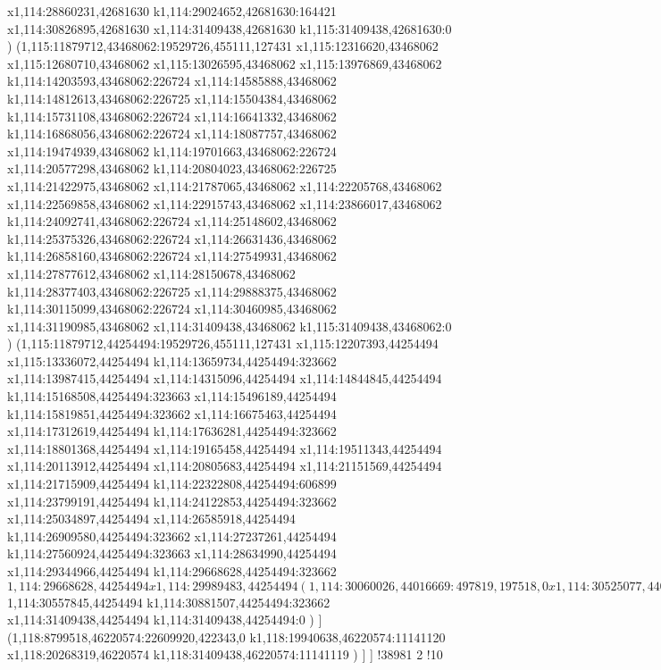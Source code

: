 {x1,114:28860231,42681630
k1,114:29024652,42681630:164421
x1,114:30826895,42681630
x1,114:31409438,42681630
k1,115:31409438,42681630:0
)
(1,115:11879712,43468062:19529726,455111,127431
x1,115:12316620,43468062
x1,115:12680710,43468062
x1,115:13026595,43468062
x1,115:13976869,43468062
k1,114:14203593,43468062:226724
x1,114:14585888,43468062
k1,114:14812613,43468062:226725
x1,114:15504384,43468062
k1,114:15731108,43468062:226724
x1,114:16641332,43468062
k1,114:16868056,43468062:226724
x1,114:18087757,43468062
x1,114:19474939,43468062
k1,114:19701663,43468062:226724
x1,114:20577298,43468062
k1,114:20804023,43468062:226725
x1,114:21422975,43468062
x1,114:21787065,43468062
x1,114:22205768,43468062
x1,114:22569858,43468062
x1,114:22915743,43468062
x1,114:23866017,43468062
k1,114:24092741,43468062:226724
x1,114:25148602,43468062
k1,114:25375326,43468062:226724
x1,114:26631436,43468062
k1,114:26858160,43468062:226724
x1,114:27549931,43468062
x1,114:27877612,43468062
x1,114:28150678,43468062
k1,114:28377403,43468062:226725
x1,114:29888375,43468062
k1,114:30115099,43468062:226724
x1,114:30460985,43468062
x1,114:31190985,43468062
x1,114:31409438,43468062
k1,115:31409438,43468062:0
)
(1,115:11879712,44254494:19529726,455111,127431
x1,115:12207393,44254494
x1,115:13336072,44254494
k1,114:13659734,44254494:323662
x1,114:13987415,44254494
x1,114:14315096,44254494
x1,114:14844845,44254494
k1,114:15168508,44254494:323663
x1,114:15496189,44254494
k1,114:15819851,44254494:323662
x1,114:16675463,44254494
x1,114:17312619,44254494
k1,114:17636281,44254494:323662
x1,114:18801368,44254494
x1,114:19165458,44254494
x1,114:19511343,44254494
x1,114:20113912,44254494
x1,114:20805683,44254494
x1,114:21151569,44254494
x1,114:21715909,44254494
k1,114:22322808,44254494:606899
x1,114:23799191,44254494
k1,114:24122853,44254494:323662
x1,114:25034897,44254494
x1,114:26585918,44254494
k1,114:26909580,44254494:323662
x1,114:27237261,44254494
k1,114:27560924,44254494:323663
x1,114:28634990,44254494
x1,114:29344966,44254494
k1,114:29668628,44254494:323662
$1,114:29668628,44254494
x1,114:29989483,44254494
(1,114:30060026,44016669:497819,197518,0
x1,114:30525077,44016669
)
$1,114:30557845,44254494
k1,114:30881507,44254494:323662
x1,114:31409438,44254494
k1,114:31409438,44254494:0
)
]
(1,118:8799518,46220574:22609920,422343,0
k1,118:19940638,46220574:11141120
x1,118:20268319,46220574
k1,118:31409438,46220574:11141119
)
]
]
!38981
}2
!10
